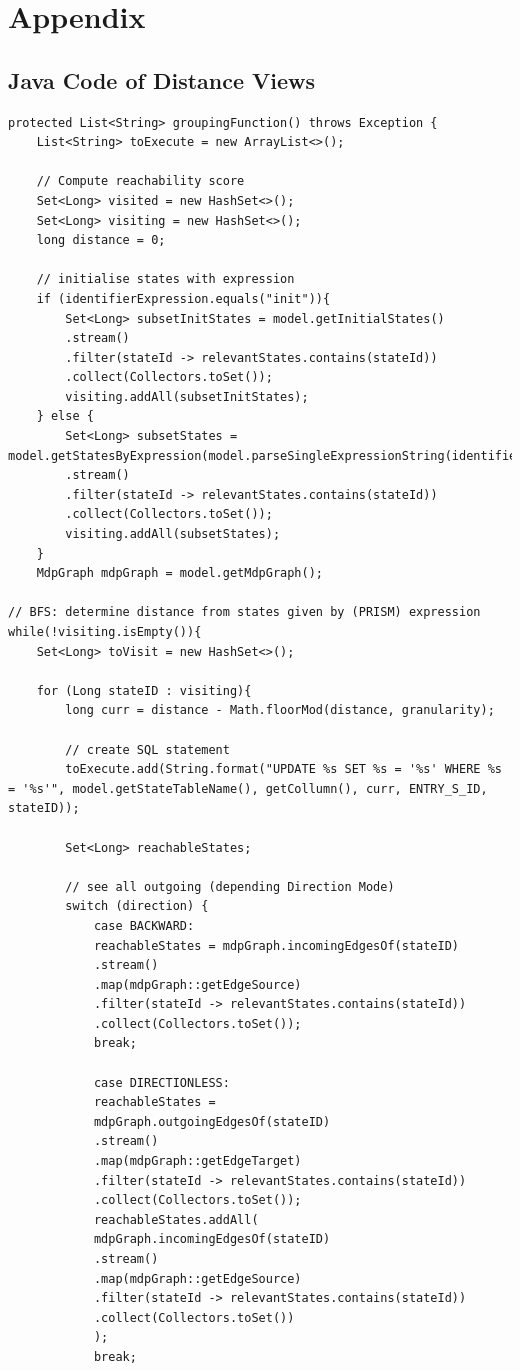 \documentclass[preview]{standalone}
\begin{document}
\section{Appendix}
\subsection[]{Java Code of Distance Views} \label{apx:distancejava}



\begin{lstlisting}[style=javaStyle, caption={grp Function java}]
protected List<String> groupingFunction() throws Exception {
	List<String> toExecute = new ArrayList<>();
	
	// Compute reachability score
	Set<Long> visited = new HashSet<>();
	Set<Long> visiting = new HashSet<>();
	long distance = 0;
	
	// initialise states with expression
	if (identifierExpression.equals("init")){
		Set<Long> subsetInitStates = model.getInitialStates()
		.stream()
		.filter(stateId -> relevantStates.contains(stateId))
		.collect(Collectors.toSet());
		visiting.addAll(subsetInitStates);
	} else {
		Set<Long> subsetStates = model.getStatesByExpression(model.parseSingleExpressionString(identifierExpression).toString())
		.stream()
		.filter(stateId -> relevantStates.contains(stateId))
		.collect(Collectors.toSet());
		visiting.addAll(subsetStates);
	}
	MdpGraph mdpGraph = model.getMdpGraph();

// BFS: determine distance from states given by (PRISM) expression
while(!visiting.isEmpty()){
	Set<Long> toVisit = new HashSet<>();
	
	for (Long stateID : visiting){
		long curr = distance - Math.floorMod(distance, granularity);
		
		// create SQL statement
		toExecute.add(String.format("UPDATE %s SET %s = '%s' WHERE %s = '%s'", model.getStateTableName(), getCollumn(), curr, ENTRY_S_ID, stateID));
		
		Set<Long> reachableStates;
		
		// see all outgoing (depending Direction Mode)
		switch (direction) {
			case BACKWARD:
			reachableStates = mdpGraph.incomingEdgesOf(stateID)
			.stream()
			.map(mdpGraph::getEdgeSource)
			.filter(stateId -> relevantStates.contains(stateId))
			.collect(Collectors.toSet());
			break;
						
			case DIRECTIONLESS:
			reachableStates =
			mdpGraph.outgoingEdgesOf(stateID)
			.stream()
			.map(mdpGraph::getEdgeTarget)
			.filter(stateId -> relevantStates.contains(stateId))
			.collect(Collectors.toSet());
			reachableStates.addAll(
			mdpGraph.incomingEdgesOf(stateID)
			.stream()
			.map(mdpGraph::getEdgeSource)
			.filter(stateId -> relevantStates.contains(stateId))
			.collect(Collectors.toSet())
			);
			break;
			

\end{lstlisting}
\end{document}
